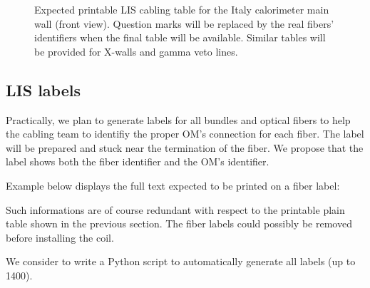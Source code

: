 \documentclass[12pt,a4paper]{article}
\newcommand{\samplespath}{./samples}
\begin{document}
\begin{figure}[h!]
  \begin{center}
    \scalebox{0.58}{}
  \end{center}
  \caption{Expected  printable   LIS  cabling  table  for   the  Italy
    calorimeter  main  wall  (front  view).  Question  marks  will  be
    replaced by the real fibers' identifiers when the final table will
    be  available. Similar  tables will  be provided  for X-walls  and
    gamma veto lines.}
  \label{fig:lis:sheet:1}
\end{figure}


\subsection{LIS labels}

Practically, we  plan to generate  labels for all bundles  and optical
fibers  to  help  the  cabling  team  to  identifiy  the  proper  OM's
connection for each fiber.  The label  will be prepared and stuck near
the termination of the fiber. We propose that the label shows both the
fiber identifier and the OM's identifier.

\noindent Example below displays the  full text expected to be printed
on a fiber label:
\begin{center}
\end{center}

\par\noindent Such  informations are of course  redundant with respect
to  the  printable   plain  table  shown  in   the  previous  section.
The  fiber labels could  possibly be removed before  installing the
coil.

\par\noindent We  consider to write  a Python script  to automatically
generate all labels (up to 1400).
\end{document}
